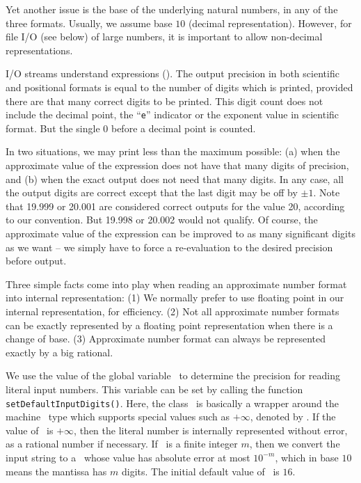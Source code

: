 \documentclass[12pt]{article}
\begin{document}
Yet another issue is the base of the underlying
natural numbers, in any of the three formats.   
Usually, we assume base $10$ (decimal representation).
However, for file I/O (see below) of large numbers,
it is important to allow non-decimal representations.

I/O streams understand expressions (\expr).  The output precision in both
scientific and positional formats is equal 
to the number of digits which is printed, provided
there are that many correct digits to be printed.
This digit count does not include the decimal point, the ``\texttt{e}''
indicator or the exponent value in scientific format.
But the single $0$ before a decimal point is counted.

In two situations, we may print less than the maximum possible:
(a) when the approximate value of the expression does not have
that many digits of precision, and
(b) when the exact output does not need that many digits.
In any case, all the output digits are correct except that
the last digit may be off by $\pm 1$.  Note that 
19.999 or 20.001 are considered correct outputs for the value 20,
according to our convention.  But 19.998 or 20.002 would not qualify.
Of course, the approximate value of the expression can be
improved to as many significant digits as we want -- we simply
have to force a re-evaluation to the desired precision before output.

Three simple facts come into play
when reading an approximate number format into internal representation:
(1) We normally prefer to use floating point in our internal
representation, for efficiency.
(2) Not all approximate number formats can be exactly represented by
a floating point representation when there is a change of base.
(3) Approximate number format can always be represented exactly
by a big rational.

We use the value of the global variable \ to
determine the precision for reading literal input numbers.
This variable can be set by
calling the function\\
\verb+setDefaultInputDigits(+\extlong\verb+)+.
Here, the class \extlong\ is basically a wrapper around the machine
\lng\ type which supports special values such as $+\infty$, denoted
by \coreInfty.  If the value of \ is $+\infty$, then the
literal number is internally represented without error,
as a rational number if necessary.  If \ is a finite integer $m$,
then we convert the input string to a \BF\ whose
value has absolute error at most $10^{-m}$, which in base $10$
means the mantissa has $m$ digits.  The initial default value of
\ is $16$.
\end{document}
